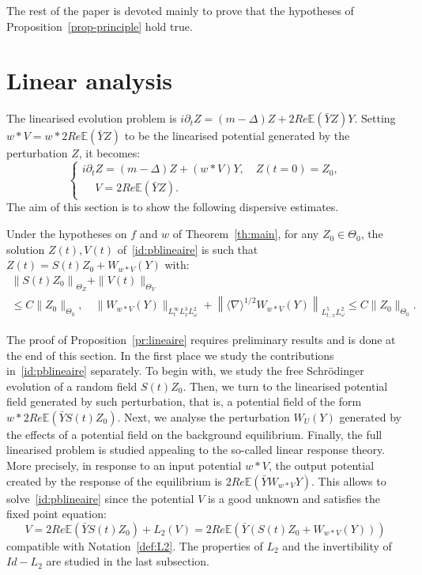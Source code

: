 \documentclass[AHL, Unicode, longabstracts,published]{cedram}
\newcommand{\E}{\mathbb{E}}
\begin{document}
The rest of the paper is devoted mainly to prove that the hypotheses of Proposition~\ref{prop-principle} hold true.


\section{Linear analysis}\label{sec:linear}


The linearised evolution problem is $i\partial_t Z=(m-\Delta) Z+2Re \E(\bar Y Z)Y$. Setting $w*V=w*2Re \E(\bar Y Z)$ to be the linearised potential generated by the perturbation $Z$, it becomes:
\begin{equation} \label{id:pblineaire}
\begin{cases}
i\partial_t Z=(m-\Delta) Z+(w*V)Y, \quad Z(t=0)=Z_0,\\
\quad\, V=2Re \E(\bar Y Z).
\end{cases}
\end{equation}
The aim of this section is to show the following dispersive estimates.

\begin{prop}\label{pr:lineaire}

Under the hypotheses on $f$ and $w$ of Theorem~\ref{th:main}, for any $Z_0\in \Theta_0$, the solution $Z(t),V(t)$ of~\eqref{id:pblineaire} is such that $Z(t)=S(t)Z_0+W_{w*V}(Y)$ with:
\begin{multline*}
\left\| S(t)Z_0\right\|_{\Theta_Z}+\| V(t)\|_{\Theta_V}\\
\leq C \| Z_0 \|_{\Theta_0}, \quad \|W_{w*V}(Y)\|_{L^{\infty}_tL^3_xL^2_\omega}+ \left\| \langle \nabla \rangle^{1/2}W_{w*V}(Y)\right\|_{ L^5_{t,\,x}L^2_\omega } \leq C \| Z_0 \|_{\Theta_0}.
\end{multline*}
\end{prop}


The proof of Proposition~\ref{pr:lineaire} requires preliminary results and is done at the end of this section. In the first place we study the contributions in~\eqref{id:pblineaire} separately. To begin with, we study the free Schr\"odinger evolution of a random field $S(t)Z_0$. Then, we turn to the linearised potential field generated by such perturbation, that is, a potential field of the form $w*2Re\E(\bar YS(t)Z_0)$. Next, we analyse the perturbation $W_U(Y)$ generated by the effects of a potential field on the background equilibrium. Finally, the full linearised problem is studied appealing to the so-called linear response theory. More precisely, in response to an input potential $w*V$, the output potential created by the response of the equilibrium is $2Re \E(\bar Y W_{w*V}Y)$. This allows to solve~\eqref{id:pblineaire} since the potential $V$ is a good unknown and satisfies the fixed point equation:
\begin{equation}
V=2Re \E\left(\bar Y S(t)Z_0\right)+L_2(V)=2Re \E\left(\bar Y (S(t)Z_0+W_{w*V}(Y))\right)
\end{equation} 
compatible with Notation~\ref{def:L2}. The properties of $L_2$ and the invertibility of $Id-L_2$ are studied in the last subsection.
\end{document}
